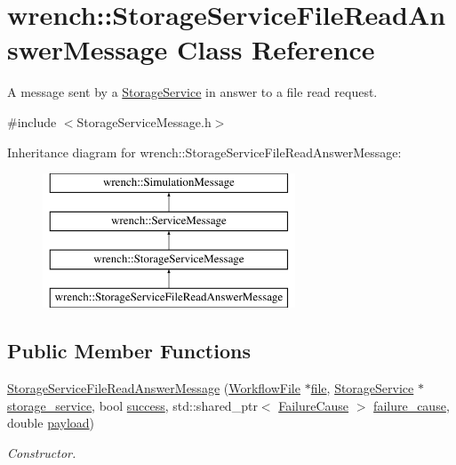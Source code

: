 \hypertarget{classwrench_1_1_storage_service_file_read_answer_message}{}\section{wrench\+:\+:Storage\+Service\+File\+Read\+Answer\+Message Class Reference}
\label{classwrench_1_1_storage_service_file_read_answer_message}


A message sent by a \hyperlink{classwrench_1_1_storage_service}{Storage\+Service} in answer to a file read request.  




{\ttfamily \#include $<$Storage\+Service\+Message.\+h$>$}

Inheritance diagram for wrench\+:\+:Storage\+Service\+File\+Read\+Answer\+Message\+:\begin{figure}[H]
\begin{center}
\leavevmode
\includegraphics[height=4.000000cm]{classwrench_1_1_storage_service_file_read_answer_message}
\end{center}
\end{figure}
\subsection*{Public Member Functions}
\begin{DoxyCompactItemize}
\item 
\hyperlink{classwrench_1_1_storage_service_file_read_answer_message_a7150fa53474a18fe479792ef639d3ee1}{Storage\+Service\+File\+Read\+Answer\+Message} (\hyperlink{classwrench_1_1_workflow_file}{Workflow\+File} $\ast$\hyperlink{classwrench_1_1_storage_service_file_read_answer_message_a126431c209d5f957502d905f1037eb94}{file}, \hyperlink{classwrench_1_1_storage_service}{Storage\+Service} $\ast$\hyperlink{classwrench_1_1_storage_service_file_read_answer_message_a3f054ff83df995b2586cec6c60c4666f}{storage\+\_\+service}, bool \hyperlink{classwrench_1_1_storage_service_file_read_answer_message_a19bf68d23a61a4bd21ebd3dc48987e00}{success}, std\+::shared\+\_\+ptr$<$ \hyperlink{classwrench_1_1_failure_cause}{Failure\+Cause} $>$ \hyperlink{classwrench_1_1_storage_service_file_read_answer_message_acef76ebea8ad44b82c8456b9840dd737}{failure\+\_\+cause}, double \hyperlink{classwrench_1_1_simulation_message_a914f2732713f7c02898e66f05a7cb8a1}{payload})
\begin{DoxyCompactList}\small\item\em Constructor. \end{DoxyCompactList}\end{DoxyCompactItemize}
